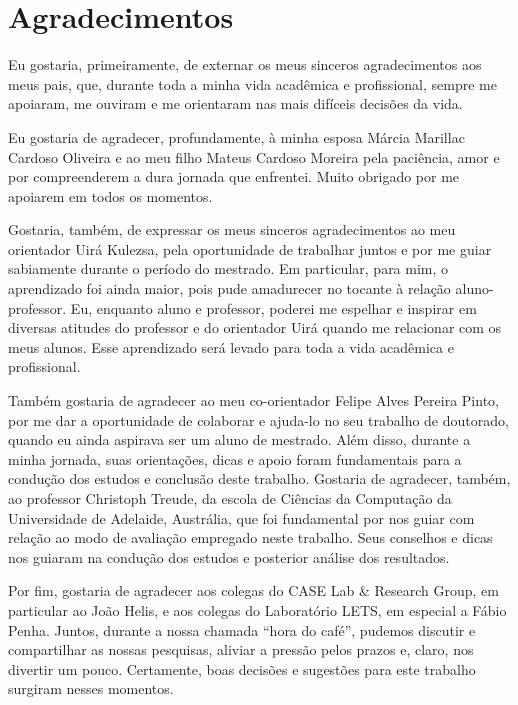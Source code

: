 
\chapter*{Agradecimentos}

Eu gostaria, primeiramente, de externar os meus sinceros agradecimentos aos meus pais, que, durante toda a minha vida acadêmica e profissional, sempre me apoiaram, me ouviram e me orientaram nas mais difíceis decisões da vida.

Eu gostaria de agradecer, profundamente, à minha esposa Márcia Marillac Cardoso Oliveira e ao meu filho Mateus Cardoso Moreira pela paciência, amor e por compreenderem a dura jornada que enfrentei. Muito obrigado por me apoiarem em todos os momentos.

Gostaria, também, de expressar os meus sinceros agradecimentos ao meu orientador Uirá Kulezsa, pela oportunidade de trabalhar juntos e por me guiar sabiamente durante o período do mestrado. Em particular, para mim, o aprendizado foi ainda maior, pois pude amadurecer no tocante à relação aluno-professor. Eu, enquanto aluno e professor, poderei me espelhar e inspirar em diversas atitudes do professor e do orientador Uirá quando me relacionar com os meus alunos. Esse aprendizado será levado para toda a vida acadêmica e profissional.

Também gostaria de agradecer ao meu co-orientador Felipe Alves Pereira Pinto, por me dar a oportunidade de colaborar e ajuda-lo no seu trabalho de doutorado, quando eu ainda aspirava ser um aluno de mestrado. Além disso, durante a minha jornada, suas orientações, dicas e apoio foram fundamentais para a condução dos estudos e conclusão deste trabalho. Gostaria de agradecer, também, ao professor Christoph Treude, da escola de Ciências da Computação da Universidade de Adelaide, Austrália, que foi fundamental por nos guiar com relação ao modo de avaliação empregado neste trabalho. Seus conselhos e dicas nos guiaram na condução dos estudos e posterior análise dos resultados.

Por fim, gostaria de agradecer aos colegas do CASE Lab \& Research Group, em particular ao João Helis, e aos colegas do Laboratório LETS, em especial a Fábio Penha. Juntos, durante a nossa chamada ``hora do café'', pudemos discutir e compartilhar as nossas pesquisas, aliviar a pressão pelos prazos e, claro, nos divertir um pouco. Certamente, boas decisões e sugestões para este trabalho surgiram nesses momentos.
